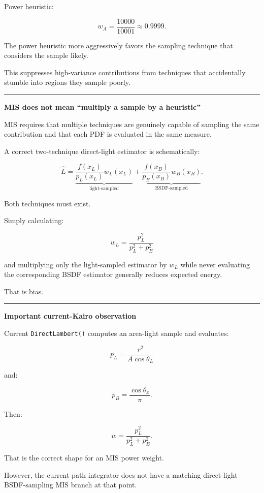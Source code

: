 Power heuristic:

\[
w_A
=
\frac{10000}{10001}
\approx0.9999.
\]

The power heuristic more aggressively favors the sampling technique that considers the sample likely.

This suppresses high-variance contributions from techniques that accidentally stumble into regions they sample poorly.

\begin{center}\rule{0.5\linewidth}{0.5pt}\end{center}

\textbf{MIS does not mean ``multiply a sample by a heuristic''}

MIS requires that multiple techniques are genuinely capable of sampling the same contribution and that each PDF is evaluated in the same measure.

A correct two-technique direct-light estimator is schematically:

\[
\hat L=
\underbrace{
\frac{
f(x_L)
}{
p_L(x_L)
}
w_L(x_L)
}_{\text{light-sampled}}
+
\underbrace{
\frac{
f(x_B)
}{
p_B(x_B)
}
w_B(x_B)
}_{\text{BSDF-sampled}}.
\]

Both techniques must exist.

Simply calculating:

\[
w_L
=
\frac{p_L^2}{p_L^2+p_B^2}
\]

and multiplying only the light-sampled estimator by \(w_L\) while never evaluating the corresponding BSDF estimator generally reduces expected energy.

That is bias.

\begin{center}\rule{0.5\linewidth}{0.5pt}\end{center}

\textbf{Important current-Kairo observation}

Current \texttt{DirectLambert()} computes an area-light sample and evaluates:

\[
p_L
=
\frac{r^2}
{A\cos\theta_L}
\]

and:

\[
p_B=
\frac{\cos\theta_x}{\pi}.
\]

Then:

\[
w=
\frac{p_L^2}{p_L^2+p_B^2}.
\]

That is the correct shape for an MIS power weight.

However, the current path integrator does not have a matching direct-light BSDF-sampling MIS branch at that point.

